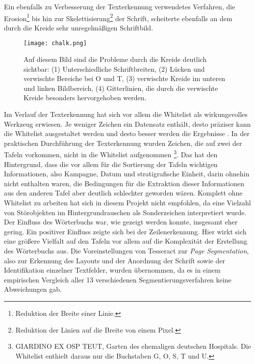 Ein ebenfalls zu Verbesserung der Texterkennung verwendetes Verfahren, die Erosion\footnote{Reduktion der Breite einer Linie.} bis hin zur Skelettisierung\footnote{Reduktion der Linien auf die Breite von einem Pixel.} \cite{hamad}{} \cite{sumedhahallale}{} der Schrift, scheiterte ebenfalls an dem durch die Kreide sehr unregelmäßigen Schriftbild.\\
\begin{figure}[h!]
\centering
\texttt{[image: chalk.png]}
\caption{Auf diesem Bild sind die Probleme durch die Kreide deutlich sichtbar: (1) Unterschiedliche Schriftbreiten, (2) Lücken und verwischte Bereiche bei O und T, (3) verwischte Kreide im unteren und linken Bildbereich, (4) Gitterlinien, die durch die verwischte Kreide besonders hervorgehoben werden.}
\label{fig:kreide}
\end{figure}
Im Verlauf der Texterkennung hat sich vor allem die Whitelist als wirkungsvolles Werkzeug erwiesen. Je weniger Zeichen ein Datensatz enthält, desto präziser kann die Whitelist ausgestaltet werden und desto besser werden die Ergebnisse \cite[p.~107]{feldmann}. In der praktischen Durchführung der Texterkennung wurden Zeichen, die auf zwei der Tafeln vorkommen, nicht in die Whitelist aufgenommen \footnote{\glqq GIARDINO EX OSP TEUT\grqq, Garten des ehemaligen deutschen Hospitals. Die Whitelist enthielt daraus nur die Buchstaben G, O, S, T und U.}. Das hat den Hintergrund, dass die vor allem für die Sortierung der Tafeln wichtigen Informationen, also Kampagne, Datum und stratigrafische Einheit, darin ohnehin nicht enthalten waren, die Bedingungen für die Extraktion dieser Informationen aus den anderen Tafel aber deutlich schlechter geworden wären.
Komplett ohne Whitelist zu arbeiten hat sich in diesem Projekt nicht empfohlen, da eine Vielzahl von Störobjekten im Hintergrundrauschen als Sonderzeichen interpretiert wurde.
Der Einfluss des Wörterbuchs war, wie gezeigt werden konnte, insgesamt eher gering. Ein positiver Einfluss zeigte sich bei der Zeilenerkennung. Hier wirkt sich eine größere Vielfalt auf den Tafeln vor allem auf die Komplexität der Erstellung des Wörterbuchs aus.
Die Voreinstellungen von Tesseract zur \textit{Page Segmentation}, also zur Erkennung des Layouts und der Anordnung der Schrift sowie der Identifikation einzelner Textfelder, wurden übernommen, da es in einem empirischen Vergleich aller 13 verschiedenen Segmentierungsverfahren keine Abweichungen gab.\\
